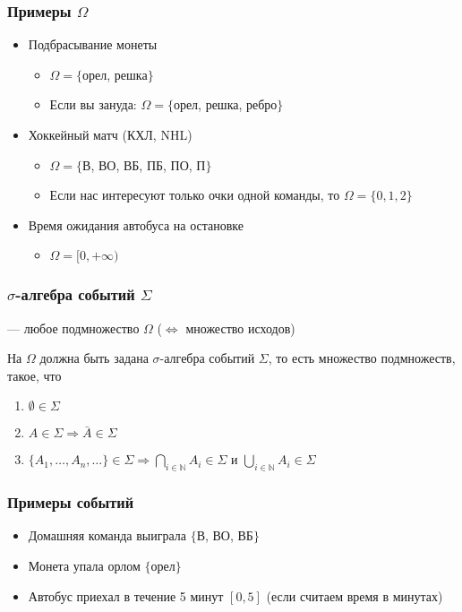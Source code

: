 \documentclass[hyperref=unicode,graphics=pdflatex,13pt,xcolor={usenames,dvipsnames}]{beamer}
\newcommand\hl[1]{{\color{blue}{#1}}}
\newcommand\pitem{\pause\item}
\newcommand\N{\mathbb{N}}
\begin{document}
\begin{frame}
  \frametitle{Примеры $\Omega$}

  \begin{itemize}
    \item Подбрасывание монеты
    \begin{itemize}
      \item $\Omega = \{$орел, решка$\}$
      \pitem Если вы зануда: $\Omega = \{$орел, решка, ребро$\}$
    \end{itemize} 
    \pitem Хоккейный матч (КХЛ, NHL)
    \begin{itemize}
      \item $\Omega = \{$В, ВО, ВБ, ПБ, ПО, П$\}$
      \item Если нас интересуют только очки одной команды, то $\Omega = \{0, 1, 2\}$
    \end{itemize}
    \pitem Время ожидания автобуса на остановке
    \begin{itemize}
      \item $\Omega = [0, +\infty)$
    \end{itemize}
  \end{itemize} 
\end{frame}

\begin{frame}
  \frametitle{$\sigma$-алгебра событий $\Sigma$}

  \hl{Событие} --- любое подмножество $\Omega$ ($\Leftrightarrow$ множество исходов)
  
  \pause
  \vspace{1ex}

  На $\Omega$ должна быть задана $\sigma$-алгебра событий $\Sigma$, то есть множество подмножеств, такое, что
  \begin{enumerate}
    \pitem $\emptyset \in \Sigma$
    \pitem $A \in \Sigma \Rightarrow \bar{A} \in \Sigma$
    \pitem $\{A_1, \dots, A_n, \dots\} \in \Sigma \Rightarrow \bigcap\limits_{i \in \N} A_i \in \Sigma$ и $\bigcup\limits_{i \in \N} A_i \in \Sigma$
  \end{enumerate}
\end{frame}

\begin{frame}
  \frametitle{Примеры событий}
  \begin{itemize}
    \item Домашняя команда выиграла $\{$В, ВО, ВБ$\}$
    \item Монета упала орлом $\{$орел$\}$
    \item Автобус приехал в течение 5 минут $[0, 5]$ (если считаем время в минутах)
  \end{itemize}
\end{frame}
\end{document}
